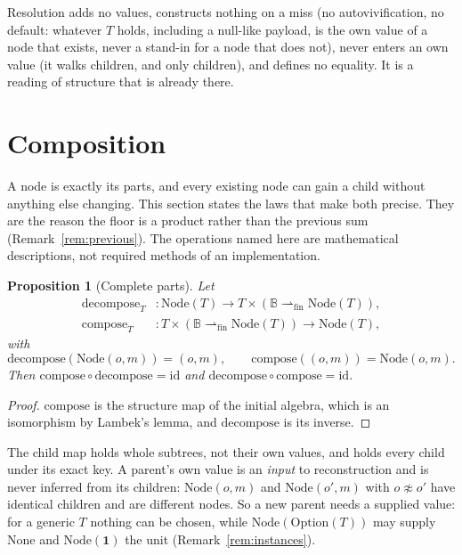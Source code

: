 \documentclass[11pt]{article}
\newtheorem{proposition}[theorem]{Proposition}
\theoremstyle{definition}
\newcommand{\Bytes}{\mathbb{B}}                    %
\newcommand{\NodeT}[1]{\mathrm{Node}(#1)}
\newcommand{\finmap}[2]{#1 \rightharpoonup_{\mathrm{fin}} #2}
\begin{document}
Resolution adds no values, constructs nothing on a miss (no autovivification, no
default: whatever $T$ holds, including a null-like payload, is the own value of a node
that exists, never a stand-in for a node that does not), never enters an own value (it walks children, and only children), and
defines no equality. It is a reading of structure
that is already there.

\section{Composition}\label{sec:composition}

A node is exactly its parts, and every existing node can gain a child without anything
else changing. This section states the laws that make both precise. They are the reason
the floor is a product rather than the previous sum (Remark~\ref{rem:previous}). The
operations named here are mathematical descriptions, not required methods of an
implementation.

\begin{proposition}[Complete parts]\label{prop:parts}
Let
\[
\begin{aligned}
\mathrm{decompose}_T &: \NodeT{T} \longrightarrow
  T \times (\finmap{\Bytes}{\NodeT{T}}),\\
\mathrm{compose}_T &: T \times (\finmap{\Bytes}{\NodeT{T}})
  \longrightarrow \NodeT{T},
\end{aligned}
\]
with
\[
\mathrm{decompose}(\mathrm{Node}(o, m)) = (o, m), \qquad
\mathrm{compose}((o, m)) = \mathrm{Node}(o, m).
\]
Then $\mathrm{compose} \circ \mathrm{decompose} = \mathrm{id}$ and
$\mathrm{decompose} \circ \mathrm{compose} = \mathrm{id}$.
\end{proposition}

\begin{proof}
$\mathrm{compose}$ is the structure map of the initial algebra, which is an isomorphism by
Lambek's lemma, and $\mathrm{decompose}$ is its inverse.
\end{proof}

The child map holds whole subtrees, not their own values, and holds every child under its
exact key. A parent's own value is an \emph{input} to reconstruction and is never inferred
from its children: $\mathrm{Node}(o, m)$ and $\mathrm{Node}(o', m)$ with $o \not\approx o'$
have identical children and are different nodes. So a new parent needs a supplied value:
for a generic $T$ nothing can be chosen, while $\NodeT{\mathrm{Option}(T)}$ may supply
$\mathrm{None}$ and $\NodeT{\mathbf{1}}$ the unit (Remark~\ref{rem:instances}).
\end{document}
